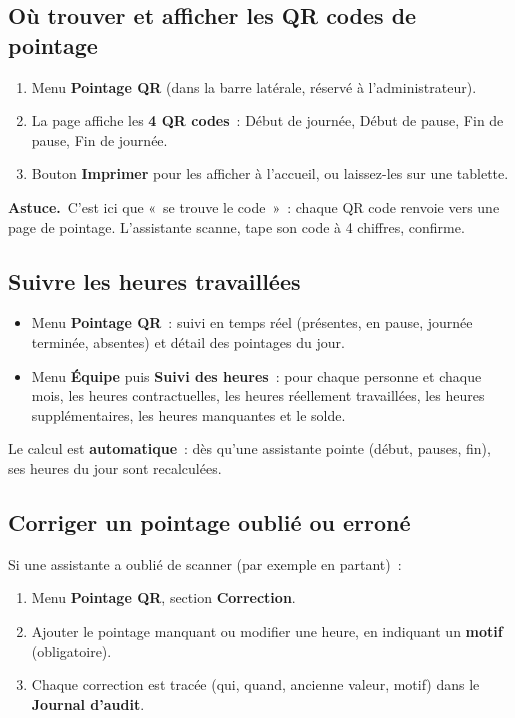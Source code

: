 \documentclass[11pt,a4paper]{article}
\newcommand{\encadre}[2]{%
  \par\smallskip\noindent
  \colorbox{#1}{\parbox{\dimexpr\linewidth-2\fboxsep}{\smallskip #2\smallskip}}%
  \par\smallskip}
\newcommand{\astuce}[1]{\encadre{faradaylight}{\textbf{\textcolor{faraday}{Astuce.}}~#1}}
\newcommand{\menu}[1]{\textbf{\textcolor{faraday}{#1}}}
\begin{document}
\subsection{Où trouver et afficher les QR codes de pointage}
\begin{enumerate}[leftmargin=1.6em]
  \item Menu \menu{Pointage QR} (dans la barre latérale, réservé à l'administrateur).
  \item La page affiche les \textbf{4 QR codes}~: Début de journée, Début de pause, Fin de pause, Fin de journée.
  \item Bouton \menu{Imprimer} pour les afficher à l'accueil, ou laissez-les sur une tablette.
\end{enumerate}
\astuce{C'est ici que «~se trouve le code~»~: chaque QR code renvoie vers une page de pointage. L'assistante scanne, tape son code à 4 chiffres, confirme.}

\subsection{Suivre les heures travaillées}
\begin{itemize}[leftmargin=1.4em]
  \item Menu \menu{Pointage QR}~: suivi en temps réel (présentes, en pause, journée terminée, absentes) et détail des pointages du jour.
  \item Menu \menu{Équipe} puis \menu{Suivi des heures}~: pour chaque personne et chaque mois, les heures contractuelles, les heures réellement travaillées, les heures supplémentaires, les heures manquantes et le solde.
\end{itemize}
Le calcul est \textbf{automatique}~: dès qu'une assistante pointe (début, pauses, fin), ses heures du jour sont recalculées.

\subsection{Corriger un pointage oublié ou erroné}
Si une assistante a oublié de scanner (par exemple en partant)~:
\begin{enumerate}[leftmargin=1.6em]
  \item Menu \menu{Pointage QR}, section \menu{Correction}.
  \item Ajouter le pointage manquant ou modifier une heure, en indiquant un \textbf{motif} (obligatoire).
  \item Chaque correction est tracée (qui, quand, ancienne valeur, motif) dans le \menu{Journal d'audit}.
\end{enumerate}
\end{document}
